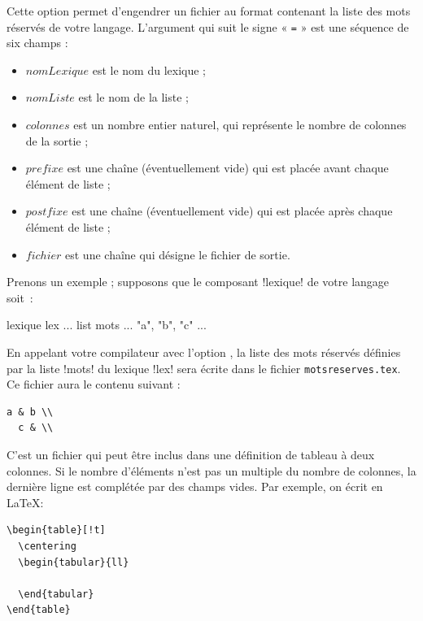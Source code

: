  Cette option permet d'engendrer un fichier au format contenant la liste des mots réservés de votre langage. L'argument qui suit le signe « \texttt{=} » est une séquence de six champs :
\begin{itemize}
  \item $nomLexique$ est le nom du lexique ;
  \item $nomListe$ est le nom de la liste ;
  \item $colonnes$ est un nombre entier naturel, qui représente le nombre de colonnes de la sortie ;
  \item $prefixe$ est une chaîne (éventuellement vide) qui est placée avant chaque élément de liste ;
  \item $postfixe$ est une chaîne (éventuellement vide) qui est placée après chaque élément de liste ;
  \item $fichier$ est une chaîne qui désigne le fichier de sortie.
\end{itemize}

Prenons un exemple ; supposons que le composant \ggsq!lexique! de votre langage soit~:
\begin{galgas4}
lexique lex {
  ...
  list mots ... { "a", "b", "c" }
  ...
}
\end{galgas4}

En appelant votre compilateur avec l'option , la liste des mots réservés définies par la liste \ggsq!mots! du lexique \ggsq!lex! sera écrite dans le fichier \texttt{motsreserves.tex}. Ce fichier aura le contenu suivant :
\begin{lstlisting}[backgroundcolor=\color{yellow!10}, frame=tlbr, basicstyle=\small\tt]
  a & b \\
  c & \\
\end{lstlisting}

C'est un fichier qui peut être inclus dans une définition de tableau à deux colonnes. Si le nombre d'éléments n'est pas un multiple du nombre de colonnes, la dernière ligne est complétée par des champs vides. Par exemple, on écrit en \LaTeX :
\begin{lstlisting}[backgroundcolor=\color{yellow!10}, frame=tlbr, basicstyle=\small\tt]
\begin{table}[!t]
  \centering
  \begin{tabular}{ll}
    
  \end{tabular}
\end{table}
\end{lstlisting}

